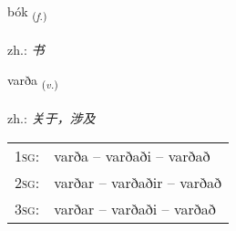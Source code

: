 \documentclass[frontgrid, backgrid]{flacards}\usepackage[]{graphicx}\usepackage[]{xcolor}
\begin{document}
\renewcommand{\blhead}{\vskip5pt {\small\bfseries\footnotesize Nafnorð | 名词 }}
\renewcommand{\bcfoot}{\vskip5pt \hspace{2pt}{\small\bfseries\footnotesize 1K}}


{bók \small{\textsubscript{(\textit{f.})}} \\[1ex] %
\textphonetic{[pouːk]} \\
zh.: \emph{书} \\  [2ex]
\renewcommand*{\arraystretch}{0.8}
}

\renewcommand{\flhead}{\vskip5pt \fboxsep=0pt {\small\bfseries\footnotesize Sagnorð | 动词}}
\renewcommand{\fcfoot}{\vskip5pt \fboxsep=0pt \hspace{2pt}{\small\bfseries\footnotesize 1K}}

\renewcommand{\blhead}{\vskip5pt {\small\bfseries\footnotesize Sagnorð | 动词 }}
\renewcommand{\bcfoot}{\vskip5pt \hspace{2pt}{\small\bfseries\footnotesize 1K}}


{varða \small{\textsubscript{(\textit{v.})}} \\[1ex] %
\textphonetic{[varða]} \\
zh.: \emph{关于，涉及} \\  [2ex]
\renewcommand*{\arraystretch}{0.8}
\begin{tabular}{p{1cm}l}
\textsc{1sg}: & varða -- varðaði -- varðað \\ 
\textsc{2sg}: & varðar -- varðaðir -- varðað \\ 
\textsc{3sg}: & varðar -- varðaði -- varðað \\ 
\end{tabular}
}

\end{document}
